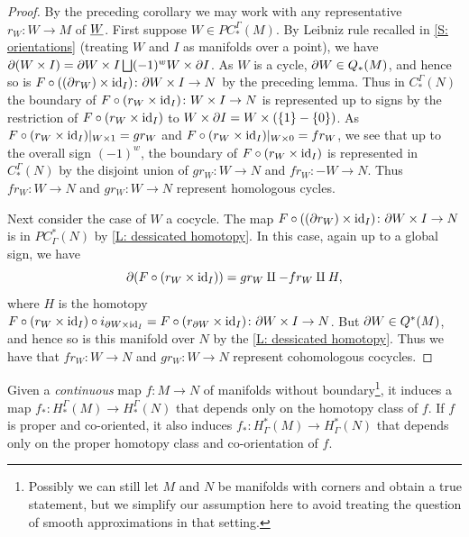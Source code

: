 \begin{proof}
	By the preceding corollary we may work with any representative $r_W \colon W \to M$ of $\underline{W}$. First suppose $W \in PC_*^\Gamma(M)$. By Leibniz rule recalled in \cref{S: orientations} (treating $W$ and $I$ as manifolds over a point), we have $\partial (W \times I) = \partial W \times I \bigsqcup (-1)^{w} W \times \partial I$. As $W$ is a cycle, $\partial W \in Q_*(M)$, and hence so is $F \circ ((\partial r_W) \times \mathrm{id}_I) \colon \partial W \times I \to N$ by the preceding lemma. Thus in $C^\Gamma_*(N)$ the boundary of $F \circ (r_W \times \mathrm{id}_I) \colon W \times I \to N$ is represented up to signs by the restriction of
	$F \circ (r_W \times \mathrm{id}_I)$ to $W \times \partial I = W \times (\{1\}-\{0\})$. As $F \circ (r_W \times \mathrm{id}_I)|_{W \times 1} = gr_W$ and $F \circ (r_W \times \mathrm{id}_I)|_{W \times 0} = fr_W$, we see that up to the overall sign $(-1)^{w}$, the boundary of $F \circ (r_W \times \mathrm{id}_I)$ is represented in $C_*^\Gamma(N)$ by the disjoint union of $gr_W \colon W \to N$ and $fr_W:-W \to N$. Thus $fr_W \colon W \to N$ and $gr_W \colon W \to N$ represent homologous cycles.

	Next consider the case of $W$ a cocycle. The map $F \circ ((\partial r_W) \times \mathrm{id}_I) \colon \partial W \times I \to N$ is in $PC^*_\Gamma(N)$ by \cref{L: dessicated homotopy}.
	In this case, again up to a global sign, we have $$\partial (F \circ (r_W \times \mathrm{id}_I)) = gr_W \amalg -fr_W \amalg H,$$ where $H$ is the homotopy $F \circ (r_W \times \mathrm{id}_I) \circ i_{\partial W \times \mathrm{id}_I} = F \circ (r_{\partial W} \times \mathrm{id}_I) \colon \partial W \times I \to N$. But $\partial W \in Q^*(M)$, and hence so is this manifold over $N$ by the \cref{L: dessicated homotopy}. Thus we have
	that $fr_W \colon W \to N$ and $gr_W \colon W \to N$ represent cohomologous cocycles.
\end{proof}

\begin{proposition}\label{P: homology homotopy functor}
	Given a \textit{continuous} map $f \colon M \to N$ of manifolds without boundary\footnote{Possibly we can still let $M$ and $N$ be manifolds with corners and obtain a true statement, but we simplify our assumption here to avoid treating the question of smooth approximations in that setting.}, it induces a map $f_*:H_*^\Gamma(M) \to H_*^\Gamma(N)$ that depends only on the homotopy class of $f$. If $f$ is proper and co-oriented, it also induces $f_*:H^*_\Gamma(M) \to H^*_\Gamma(N)$ that depends only on the proper homotopy class and co-orientation of $f$.
\end{proposition}

